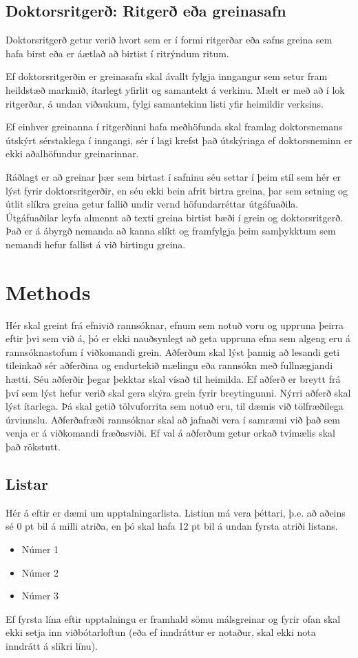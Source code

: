 \documentclass[a4paper, 12pt, twoside]{scrreprt}
\begin{document}
\section{Doktorsritgerð: Ritgerð eða greinasafn}
Doktorsritgerð getur verið hvort sem er í formi ritgerðar eða safns greina sem hafa birst eða  er áætlað að birtist í ritrýndum ritum. 

Ef doktorsritgerðin er greinasafn skal ávallt fylgja inngangur sem setur fram heildstæð markmið, ítarlegt yfirlit og samantekt á verkinu. Mælt er með að í lok ritgerðar, á undan viðaukum, fylgi samantekinn listi yfir heimildir verksins.

Ef einhver greinanna í ritgerðinni hafa meðhöfunda skal framlag doktorsnemans útskýrt sérstaklega í inngangi, sér í lagi krefst það útskýringa ef doktorsneminn er ekki aðalhöfundur greinarinnar. 

Ráðlagt er að greinar þær sem birtast í safninu séu settar í þeim stíl sem hér er lýst fyrir doktorsritgerðir, en séu ekki bein afrit birtra greina, þar sem setning og útlit slíkra greina getur fallið undir vernd höfundarréttar útgáfuaðila. Útgáfuaðilar leyfa almennt að texti greina birtist bæði í grein og doktorsritgerð. Það er á ábyrgð nemanda að kanna slíkt og framfylgja þeim samþykktum sem nemandi hefur fallist á við birtingu greina.
 
\chapter{Methods}
Hér skal greint frá efnivið rannsóknar, efnum sem notuð voru og uppruna þeirra eftir þvi sem við á, þó er ekki nauðsynlegt að geta uppruna efna sem algeng eru á rannsóknastofum í viðkomandi grein. Aðferðum skal lýst þannig að lesandi geti tileinkað sér aðferðina og endurtekið mælingu eða rannsókn með fullnægjandi hætti. Séu aðferðir þegar þekktar skal vísað til heimilda. Ef aðferð er breytt frá því sem lýst hefur verið skal gera skýra grein fyrir breytingunni. Nýrri aðferð skal lýst ítarlega. Þá skal getið tölvuforrita sem notuð eru, til dæmis við tölfræðilega úrvinnslu. Aðferðafræði rannsóknar skal að jafnaði vera í samræmi við það sem venja er á viðkomandi fræðasviði. Ef val á aðferðum getur orkað tvímælis skal það rökstutt.

\section{Listar}
Hér á eftir er dæmi um upptalningarlista. Listinn má vera þéttari, þ.e. að aðeins sé 0 pt bil á milli atriða, en þó skal hafa 12 pt bil á undan fyrsta atriði listans.
\begin{itemize}
 \item Númer 1
 \item Númer 2
 \item Númer 3
\end{itemize}
Ef fyrsta lína eftir upptalningu er framhald sömu málsgreinar og fyrir ofan skal ekki setja inn viðbótarloftun (eða ef inndráttur er notaður, skal ekki nota inndrátt á slíkri línu). 
\end{document}
